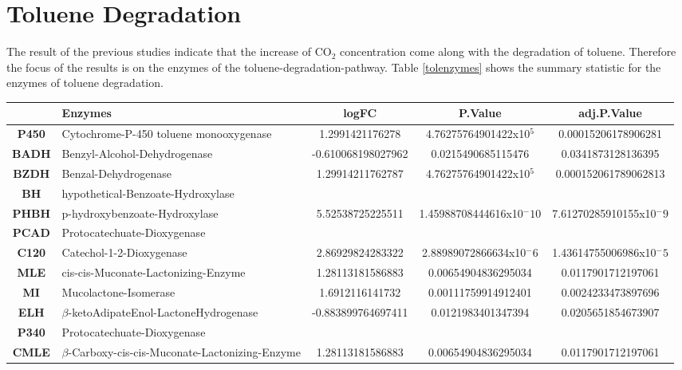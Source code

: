 \documentclass[12pt, a4paper]{report}
\begin{document}
\newpage
\section{Toluene Degradation}
The result of the previous studies indicate that the increase of CO$_2$ concentration come along with the degradation of toluene. Therefore the focus of the results is on the enzymes of the toluene-degradation-pathway. Table \ref{tolenzymes} shows the summary statistic for the enzymes of toluene degradation. 

\begin{table}[ht]
	\centering 
	\tiny
	\begin{tabular}{c p{4cm}|c|c|c}
		& \textbf{Enzymes}& \textbf{logFC} & \textbf{P.Value} & \textbf{adj.P.Value} \\
		\hline
		\textbf{P450} & Cytochrome-P-450 toluene monooxygenase & 1.2991421176278 & 4.76275764901422x10$^5$ & 0.00015206178906281 \\
		\hline
		\textbf{BADH} & Benzyl-Alcohol-Dehydrogenase & -0.610068198027962 & 0.0215490685115476 & 0.0341873128136395 \\
		\hline
		\textbf{BZDH} & Benzal-Dehydrogenase & 1.29914211762787 & 4.76275764901422x10$^5$ & 0.000152061789062813 \\
		\hline
		\textbf{BH} & hypothetical-Benzoate-Hydroxylase & & & \\
		\hline
		\textbf{PHBH} & p-hydroxybenzoate-Hydroxylase & 5.52538725225511 & 1.45988708444616x10$^-10$ & 7.61270285910155x10$^-9$  \\
		\hline
		\textbf{PCAD} & Protocatechuate-Dioxygenase & & & \\
		\hline
		\textbf{C120} & Catechol-1-2-Dioxygenase & 2.86929824283322 & 2.88989072866634x10$^-6$ & 1.43614755006986x10$^-5$ \\
		\hline
		\textbf{MLE} & cis-cis-Muconate-Lactonizing-Enzyme & 1.28113181586883 & 0.00654904836295034 & 0.0117901712197061 \\
		\hline
		\textbf{MI} & Mucolactone-Isomerase & 1.6912116141732 & 0.00111759914912401 & 0.0024233473897696 \\
		\hline
		\textbf{ELH} & $\beta$-ketoAdipateEnol-LactoneHydrogenase & -0.883899764697411 & 0.0121983401347394 & 0.0205651854673907 \\
		\hline
		\textbf{P340} & Protocatechuate-Dioxygenase & & & \\
		\hline
		\textbf{CMLE} & $\beta$-Carboxy-cis-cis-Muconate-Lactonizing-Enzyme & 1.28113181586883 & 0.00654904836295034 & 0.0117901712197061 \\

\end{tabular}
\end{table}
\end{document}
